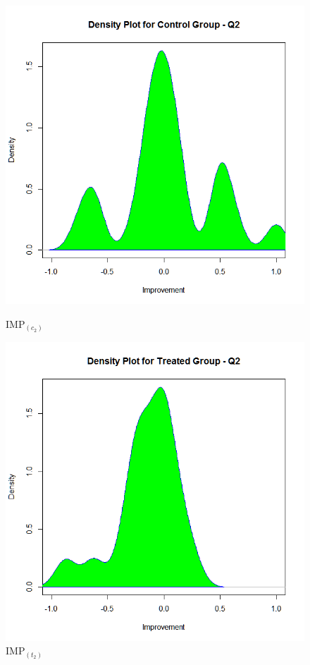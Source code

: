 \begin{figure}
	\centering
	\begin{minipage}{.5\textwidth}
		\centering
		\includegraphics[width=1\linewidth]{figures/Imp_Control-q2}
		\caption{IMP$_{(c_2)}$}
		\label{fig:Imp_Control-q2}
	\end{minipage}%
	\begin{minipage}{.5\textwidth}
		\centering
		\includegraphics[width=1\linewidth]{figures/Imp_Treated-q2}
		\caption{IMP$_{(t_2)}$}
		\label{fig:Imp_Treated-q2}
	\end{minipage}
\end{figure}

